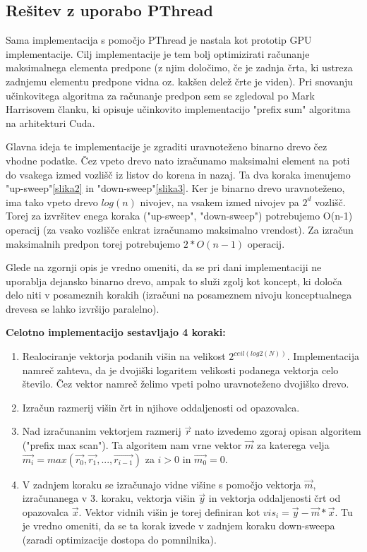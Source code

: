 \documentclass[a4paper,11pt]{article}
\begin{document}
\subsection{Rešitev z uporabo PThread}
Sama implementacija s pomočjo PThread je nastala kot prototip GPU implementacije. Cilj implementacije je tem bolj optimizirati računanje maksimalnega elementa predpone (z njim določimo, če je zadnja črta, ki ustreza zadnjemu elementu predpone vidna oz. kakšen delež črte je viden). Pri snovanju učinkovitega algoritma za računanje predpon sem se zgledoval po Mark Harrisovem članku, ki opisuje učinkovito implementacijo "prefix sum" algoritma na arhitekturi Cuda\cite{bib:nvidiaPrefix}.

\noindent Glavna ideja te implementacije je zgraditi uravnoteženo binarno drevo čez vhodne podatke. Čez vpeto drevo nato izračunamo maksimalni element na poti do vsakega izmed vozlišč iz listov do korena in nazaj. Ta dva koraka imenujemo "up-sweep"\ref{slika2} in "down-sweep"\ref{slika3}. Ker je binarno drevo uravnoteženo, ima tako vpeto drevo $log(n)$ nivojev, na vsakem izmed nivojev pa $2^d$ vozlišč. Torej za izvršitev enega koraka ("up-sweep", "down-sweep") potrebujemo O(n-1) operacij (za vsako vozlišče enkrat izračunamo maksimalno vrendost). Za izračun maksimalnih predpon torej potrebujemo $2 * O(n-1)$ operacij. 

\noindent
Glede na zgornji opis je vredno omeniti, da se pri dani implementaciji ne uporablja dejansko binarno drevo, ampak to služi zgolj kot koncept, ki določa delo niti v posameznih korakih (izračuni na posameznem nivoju konceptualnega drevesa se lahko izvršijo paralelno).


\noindent
\textbf{Celotno implementacijo sestavljajo 4 koraki:}
\begin{enumerate}
\item Realociranje vektorja podanih višin na velikost $2^{ceil(log2(N))}$. Implementacija namreč zahteva, da je dvojiški logaritem velikosti podanega vektorja celo število. Čez vektor namreč želimo vpeti polno uravnoteženo dvojiško drevo.
\item Izračun razmerij višin črt in njihove oddaljenosti od opazovalca.
\item Nad izračunanim vektorjem razmerij $\vec{r}$ nato izvedemo zgoraj opisan algoritem ("prefix max scan"). Ta algoritem nam vrne vektor  $\vec{m}$ za katerega velja $\vec{m_i} = max(\vec{r_0}, \vec{r_1}, ..., \vec{r_{i-1}})$ za $i > 0$ in $\vec{m_0} = 0$.
\item V zadnjem koraku se izračunajo vidne višine s pomočjo vektorja $\vec{m}$, izračunanega v 3. koraku, vektorja višin $\vec{y}$ in vektorja oddaljenosti črt od opazovalca $\vec{x}$. Vektor vidnih višin je torej definiran kot $vis_{i} = \vec{y} - \vec{m} * \vec{x}$. Tu je vredno omeniti, da se ta korak izvede v zadnjem koraku down-sweepa (zaradi optimizacije dostopa do pomnilnika).
\end{enumerate} 
\end{document}

